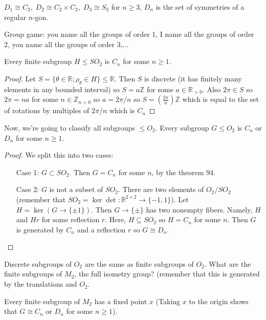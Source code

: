 \documentclass{article}
\newcommand{\R}{\mathbb{R}}
\newcommand{\Z}{\mathbb{Z}}
\newcommand{\ra}[1][]{\xrightarrow{#1}}
\begin{document}
\begin{fact}
$D_1\cong C_2,\; D_2\cong C_2\times C_2,\; D_3\cong S_3$ for $n\geq 3$, $D_n$ is the set of symmetries of a regular $n$-gon.
\end{fact}
\begin{fact}
Group game: you name all the groups of order 1, I name all the groups of order 2, you name all the groups of order 3,...
\end{fact}
\begin{theorem}
Every finite subgroup $H\leq SO_2$ is $C_n$ for some $n\geq 1$.
\end{theorem}
\begin{proof}
Let $S=\{\theta\in\R;\rho_\theta\in H\}\leq \R$. Then $S$ is discrete (it has finitely many elements in any bounded interval) so $S=a\Z$ for some $a\in \R_{>0}$. Also $2\pi\in S$ so $2\pi=na$ for some $n\in \Z_{n>0}$ so $a=2\pi/n$ so $S=(\frac{2\pi}{n})\Z$ which is equal to the set of rotations by multiples of $2\pi/n$ which is $C_n$
\end{proof}
\begin{theorem}
Now, we're going to classify all subgroups $\leq O_2$. Every subgroup $G\leq O_2$ is $C_n$ or $D_n$ for some $n\geq 1$.
\end{theorem}
\begin{proof}
We split this into two cases:
\begin{itemize}
    \item[Case 1:] $G\subset SO_2$. Then $G=C_n$ for some $n$, by the theorem 94.
    \item[Case 2:] $G$ is not a subset of $SO_2$. There are two elements of $O_2/SO_2$ (remember that $SO_2=\ker\det:\R^{2\times 2}\ra \{-1,1\}$). Let $H=\ker(G\ra\{\pm 1\})$. Then $G\ra\{\pm\}$ has two nonempty fibers. Namely, $H$ and $Hr$ for some reflection $r$. Here, $H\subseteq SO_2$ so $H=C_n$ for some $n$. Then $G$ is generated by $C_n$ and a reflection $r$ so $G\cong D_n$.
\end{itemize}
\end{proof}
Discrete subgroups of $O_2$ are the same as finite subgroups of $O_2$. What are the finite subgroups of $M_2$, the full isometry group? (remember that this is generated by the translations and $O_2$.
\begin{theorem}
Every finite subgroup of $M_2$ has a fixed point $x$ (Taking $x$ to the origin shows that $G\cong C_n$ or $D_n$ for some $n\geq 1$).
\end{theorem}
\end{document}
